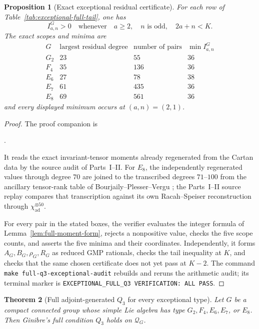 \documentclass[11pt,reqno]{amsart}
\theoremstyle{plain}
\newtheorem{theorem}{Theorem}[section]
\newtheorem{proposition}[theorem]{Proposition}
\theoremstyle{definition}
\newcommand{\chiad}{\chi_{\mathrm{ad}}}
\newcommand{\Qcone}{\mathcal Q}
\begin{document}
\begin{proposition}[Exact exceptional residual certificate]
\label{prop:exceptional-full-residual}
For each row of Table~\ref{tab:exceptional-full-tail}, one has
\[
 I^G_{a,n}>0
 \quad\text{whenever}\quad
 a\geq2,\quad n\text{ is odd},\quad 2a+n<K.
\]
The exact scopes and minima are
\[
\begin{array}{c|rrr}
G&\text{largest residual degree}&\text{number of pairs}&
 \min I^G_{a,n}\\ \hline
G_2&23&55&36\\
F_4&35&136&36\\
E_6&27&78&38\\
E_7&61&435&36\\
E_8&69&561&36
\end{array}
\]
and every displayed minimum occurs at $(a,n)=(2,1)$.
\end{proposition}

\begin{proof}
The proof companion is
\begin{center}
.
\end{center}
It reads the exact invariant-tensor moments already regenerated from the
Cartan data by the source audit of Parts~I--II.  For $E_8$, the independently
regenerated values through degree $70$ are joined to the transcribed degrees
$71$--$100$ from the ancillary tensor-rank table of
Bourjaily--Plesser--Vergu
\cite[ancillary file \texttt{adjoint\_tensor\_ranks.tex}]{BPV2024}; the
Parts~I--II source replay compares that transcription against its own
Racah--Speiser reconstruction through $\chiad^{\otimes50}$.

For every pair in the stated boxes, the verifier evaluates the integer
formula of Lemma~\ref{lem:full-moment-form}, rejects a nonpositive value,
checks the five scope counts, and asserts the five minima and their
coordinates.  Independently, it forms $A_G,B_G,\rho_G,R_G$ as reduced GMP
rationals, checks the tail inequality at $K$, and checks that the same chosen
certificate does not yet pass at $K-2$.  The command
\texttt{make full-q3-exceptional-audit} rebuilds and reruns the arithmetic
audit; its terminal marker is
\texttt{EXCEPTIONAL\_FULL\_Q3 VERIFICATION: ALL PASS}.
\end{proof}

\begin{theorem}[Full adjoint-generated $Q_3$ for every exceptional type]
\label{thm:exceptional-full-cone}
Let $G$ be a compact connected group whose simple Lie algebra has type
$G_2,F_4,E_6,E_7$, or $E_8$.  Then Ginibre's full condition $Q_3$ holds on
$\Qcone_G$.
\end{theorem}
\end{document}
